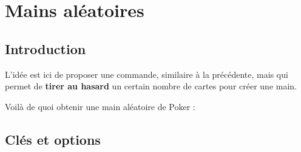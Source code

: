 \documentclass[a4paper]{article}
\begin{document}
\begin{codetex}[]
\MainCartesJeu[Hauteur=1.75,StyleJeu=bicycl,EspH=1]{\JeuCompletPokerTriCoul}
\end{codetex}

\pagebreak

\section{Mains aléatoires}

\subsection{Introduction}

\begin{codeidee}
L'idée est ici de proposer une commande, similaire à la précédente, mais qui permet de \textbf{tirer au hasard} un certain nombre de cartes pour créer une main.
\end{codeidee}

\begin{codetex}
\end{codetex}

\begin{codetex}[]
Voilà de quoi obtenir une main aléatoire de Poker :

\end{codetex}

\subsection{Clés et options}
\end{document}
